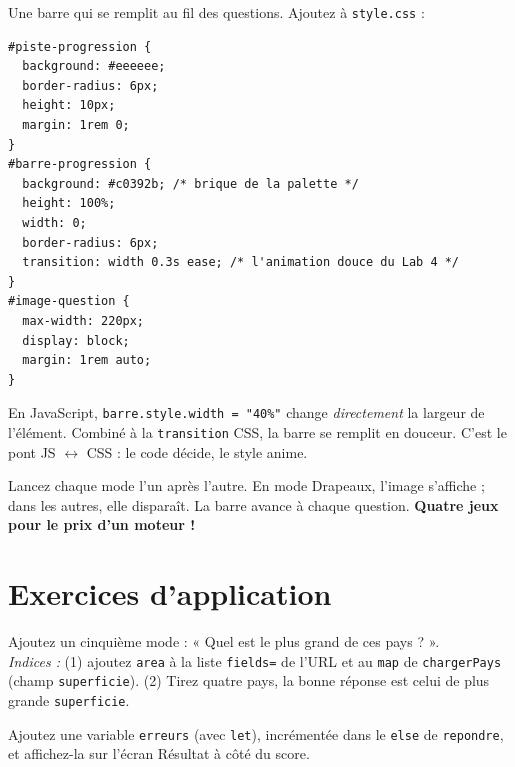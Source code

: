 \documentclass[11pt,a4paper]{article}
\newcommand{\code}[1]{\texttt{#1}}
\begin{document}
Une barre qui se remplit au fil des questions. Ajoutez à \code{style.css} :

\begin{lstlisting}[style=html]
#piste-progression {
  background: #eeeeee;
  border-radius: 6px;
  height: 10px;
  margin: 1rem 0;
}
#barre-progression {
  background: #c0392b; /* brique de la palette */
  height: 100%;
  width: 0;
  border-radius: 6px;
  transition: width 0.3s ease; /* l'animation douce du Lab 4 */
}
#image-question {
  max-width: 220px;
  display: block;
  margin: 1rem auto;
}
\end{lstlisting}

\begin{infobox}
En JavaScript, \code{barre.style.width = "40\%"} change \emph{directement} la largeur de l'élément. Combiné à la \code{transition} CSS, la barre se remplit en douceur. C'est le pont JS $\leftrightarrow$ CSS : le code décide, le style anime.
\end{infobox}

\begin{infobox}[Vérification]
Lancez chaque mode l'un après l'autre. En mode Drapeaux, l'image s'affiche ; dans les autres, elle disparaît. La barre avance à chaque question. \textbf{Quatre jeux pour le prix d'un moteur !}
\end{infobox}

\section{Exercices d'application}

\begin{objectifbox}
Ajoutez un cinquième mode : « Quel est le plus grand de ces pays ? ».\\
\emph{Indices :} (1) ajoutez \code{area} à la liste \code{fields=} de l'URL et au \code{map} de \code{chargerPays} (champ \code{superficie}). (2) Tirez quatre pays, la bonne réponse est celui de plus grande \code{superficie}.
\end{objectifbox}

\begin{objectifbox}
Ajoutez une variable \code{erreurs} (avec \code{let}), incrémentée dans le \code{else} de \code{repondre}, et affichez-la sur l'écran Résultat à côté du score.
\end{objectifbox}
\end{document}
